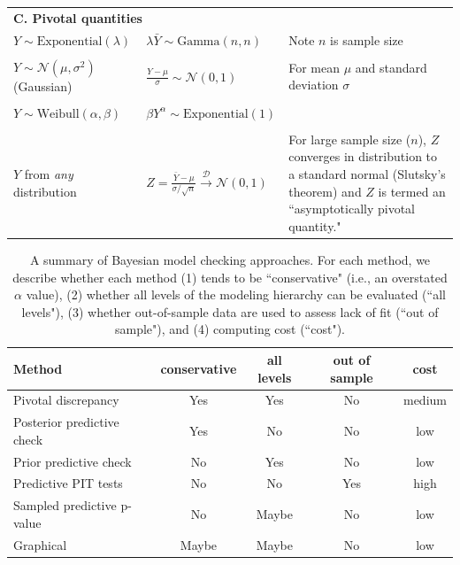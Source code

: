 \documentclass[12pt,english]{article}
\begin{document}
\begin{spacing}{1.9}
\begin{table}[htp]
\begin{tabular}{p{4cm}lp{5cm}}
    \multicolumn{3}{l}{\textbf{C. Pivotal quantities}} \\
    $Y  \sim \textrm{Exponential}(\lambda)$ & $\lambda \bar{Y} \sim \textrm{Gamma}(n,n)$ & Note $n$ is sample size\\
         & & \\
    $Y \sim \mathcal{N}(\mu,\sigma^2)$ (Gaussian) & $ \frac{Y - \mu}{\sigma} \sim \mathcal{N}(0,1) $ & For mean $\mu$ and standard deviation $\sigma$  \\
         & & \\
    $Y \sim \textrm{Weibull}(\alpha,\beta)$ & $ \beta Y^\alpha \sim \textrm{Exponential}(1) $ & \\
         & & \\
    $Y$ from {\it any} distribution & $Z = \frac{\bar{Y}-\mu}{\sigma/\sqrt{n}} \xrightarrow[]{\mathcal{D}} \mathcal{N}(0,1)$ & For large sample size ($n$), $Z$ converges in distribution to a standard normal (Slutsky's theorem) and $Z$ is termed an ``asymptotically pivotal quantity." \\
    \hline
  \end{tabular}
\end{table}


\begin{table}[htp]
  \caption{A summary of Bayesian model checking approaches.  For each method, we describe whether each method (1) tends to be ``conservative" (i.e., an overstated $\alpha$ value), (2) whether all levels of the modeling hierarchy can be evaluated (``all levels"), (3) whether out-of-sample data are used to assess lack of fit (``out of sample"), and (4) computing cost (``cost").
  }
  \label{tab:checks}
  \centering
  \begin{tabular}{lcccc}
    \hline
    Method & conservative & all levels & out of sample  & cost\\
    \hline
    Pivotal discrepancy & Yes & Yes & No & medium \\
    Posterior predictive check & Yes & No & No & low \\
    Prior predictive check & No & Yes & No & low \\
    Predictive PIT tests &  No & No & Yes & high \\
    Sampled predictive p-value & No & Maybe & No & low \\
    Graphical & Maybe & Maybe &  No & low \\
    \hline
  \end{tabular}
\end{table}


\end{spacing}
\end{document}
